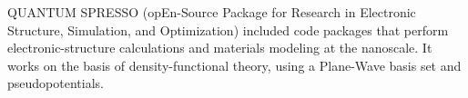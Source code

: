 QUANTUM SPRESSO (opEn-Source Package for Research in Electronic Structure, Simulation, and Optimization) included code packages that perform electronic-structure calculations and materials modeling at the nanoscale. It works on the basis of density-functional theory, using a Plane-Wave basis set and pseudopotentials.